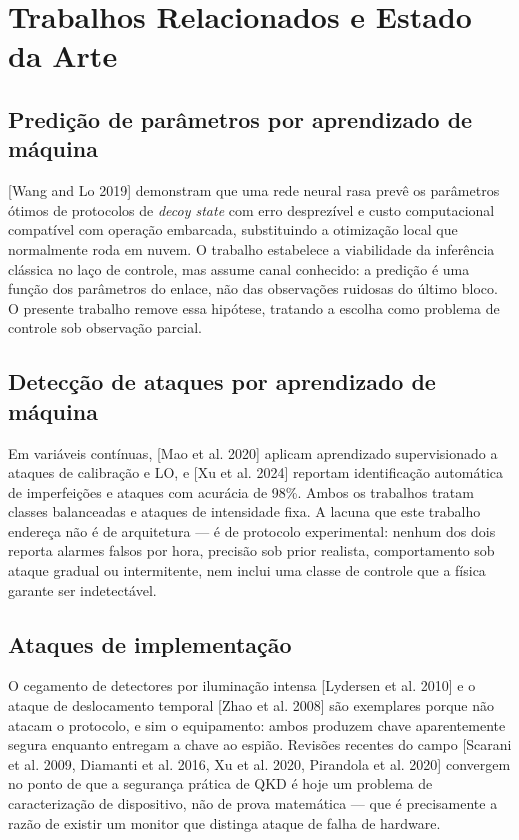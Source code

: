 \documentclass[12pt]{article}
\begin{document}
\section{Trabalhos Relacionados e Estado da Arte}

\subsection{Predição de parâmetros por aprendizado de máquina}

[Wang and Lo 2019] demonstram que uma rede neural rasa prevê os parâmetros ótimos
de protocolos de \emph{decoy state} com erro desprezível e custo computacional
compatível com operação embarcada, substituindo a otimização local que
normalmente roda em nuvem. O trabalho estabelece a viabilidade da inferência
clássica no laço de controle, mas assume canal conhecido: a predição é uma função
dos parâmetros do enlace, não das observações ruidosas do último bloco. O presente
trabalho remove essa hipótese, tratando a escolha como problema de controle sob
observação parcial.

\subsection{Detecção de ataques por aprendizado de máquina}

Em variáveis contínuas, [Mao et al. 2020] aplicam aprendizado supervisionado a
ataques de calibração e LO, e [Xu et al. 2024] reportam identificação automática
de imperfeições e ataques com acurácia de 98\%. Ambos os trabalhos tratam classes
balanceadas e ataques de intensidade fixa. A lacuna que este trabalho endereça
não é de arquitetura --- é de protocolo experimental: nenhum dos dois reporta
alarmes falsos por hora, precisão sob prior realista, comportamento sob ataque
gradual ou intermitente, nem inclui uma classe de controle que a física garante
ser indetectável.

\subsection{Ataques de implementação}

O cegamento de detectores por iluminação intensa [Lydersen et al. 2010] e o
ataque de deslocamento temporal [Zhao et al. 2008] são exemplares porque não
atacam o protocolo, e sim o equipamento: ambos produzem chave aparentemente
segura enquanto entregam a chave ao espião. Revisões recentes do campo
[Scarani et al. 2009, Diamanti et al. 2016, Xu et al. 2020, Pirandola et al. 2020]
convergem no ponto de que a segurança prática de QKD é hoje um problema de
caracterização de dispositivo, não de prova matemática --- que é precisamente a
razão de existir um monitor que distinga ataque de falha de hardware.
\end{document}
